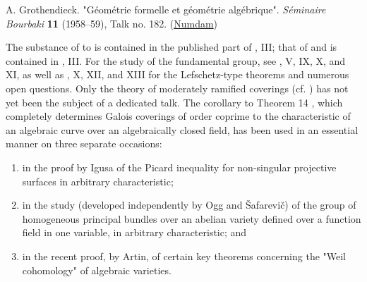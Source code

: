 
A. Grothendieck.
"Géométrie formelle et géométrie algébrique".
\emph{Séminaire Bourbaki} \textbf{11} (1958–59), Talk no. 182.
(\href{http://www.numdam.org/book-part/SB_1958-1960__5__193_0/}{Numdam})

The substance of  to  is contained in the published part of \cite{GD1960}, III;
that of  and  is contained in \cite{Gro1960b}, III.
For the study of the fundamental group, see \cite{Gro1960b}, V, IX, X, and XI, as well as \cite{Gro1960b}, X, XII, and XIII for the Lefschetz-type theorems and numerous open questions.
Only the theory of moderately ramified coverings (cf. ) has not yet been the subject of a dedicated talk.
The corollary to Theorem 14 , which completely determines Galois coverings of order coprime to the characteristic of an algebraic curve over an algebraically closed field, has been used in an essential manner on three separate occasions:

\begin{enumerate}
    \item in the proof by Igusa of the Picard inequality for non-singular projective surfaces in arbitrary characteristic;
    \item in the study (developed independently by Ogg and Šafarevič) of the group of homogeneous principal bundles over an abelian variety defined over a function field in one variable, in arbitrary characteristic; and
    \item  in the recent proof, by Artin, of certain key theorems concerning the "Weil cohomology" of algebraic varieties.
\end{enumerate}